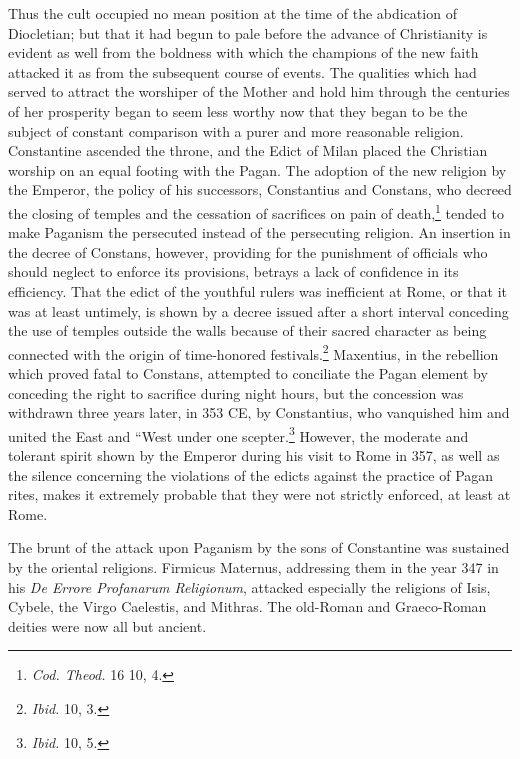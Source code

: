 \documentclass[a4paper, 11pt, oneside, polutonikogreek, french]{article}
\begin{document}
Thus the cult occupied no mean position at the time of the abdication of Diocletian; but that it had begun to pale before the advance of Christianity is evident as well from the boldness with which the champions of the new faith attacked it as from the subsequent course of events. The qualities which had served to attract the worshiper of the Mother and hold him through the centuries of her prosperity began to seem less worthy now that they began to be the subject of constant comparison with a purer and more reasonable religion. Constantine ascended the throne, and the Edict of Milan placed the Christian worship on an equal footing with the Pagan. The adoption of the new religion by the Emperor, the policy of his successors, Constantius and Constans, who decreed the closing of temples and the cessation of sacrifices on pain of death,\footnote{\emph{Cod. Theod.} 16 10, 4.} tended to make Paganism the persecuted instead of the persecuting religion. An insertion in the decree of Constans, however, providing for the punishment of officials who should neglect to enforce its provisions, betrays a lack of confidence in its efficiency. That the edict of the youthful rulers was inefficient at Rome, or that it was at least untimely, is shown by a decree issued after a short interval conceding the use of temples outside the walls because of their sacred character as being connected with the origin of time-honored festivals.\footnote{\emph{Ibid.} 10, 3.} Maxentius, in the rebellion which proved fatal to Constans, attempted to conciliate the Pagan element by conceding the right to sacrifice during night hours, but the concession was withdrawn three years later, in 353 \textsc{CE}, by Constantius, who vanquished him and united the East and ``West under one scepter.\footnote{\emph{Ibid.} 10, 5.} However, the moderate and tolerant spirit shown by the Emperor during his visit to Rome in 357, as well as the silence concerning the violations of the edicts against the practice of Pagan rites, makes it extremely probable that they were not strictly enforced, at least at Rome.

The brunt of the attack upon Paganism by the sons of Constantine was sustained by the oriental religions. Firmicus Maternus, addressing them in the year 347 in his \emph{De Errore Profanarum Religionum}, attacked especially the religions of Isis, Cybele, the Virgo Caelestis, and Mithras. The old-Roman and Graeco-Roman deities were now all but ancient.
\end{document}
